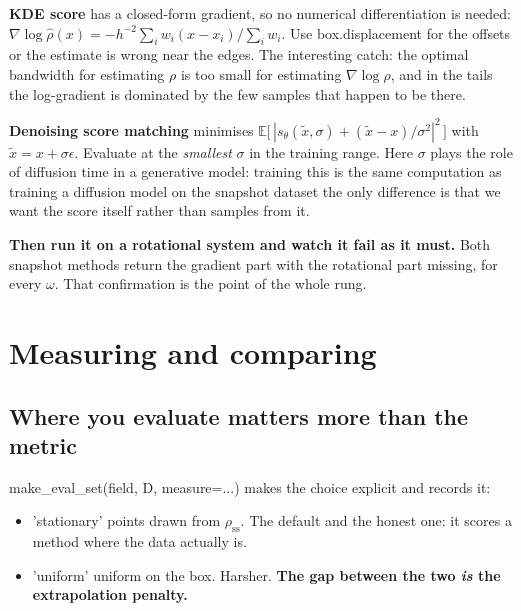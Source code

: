 \documentclass[11pt,a4paper]{article}
\newcommand{\code}[1]{{\ttfamily\small #1}}
\begin{document}
\textbf{KDE score} has a closed-form gradient, so no numerical differentiation is
needed:
$\nabla\log\hat\rho(x) = -h^{-2}\sum_i w_i (x-x_i)\big/\sum_i w_i$. Use
\code{box.displacement} for the offsets or the estimate is wrong near the edges. The
interesting catch: the optimal bandwidth for estimating $\rho$ is too small for
estimating $\nabla\log\rho$, and in the tails the log-gradient is dominated by the few
samples that happen to be there.

\textbf{Denoising score matching} minimises
$\mathbb{E}\big[\,|s_\theta(\tilde x,\sigma) + (\tilde x - x)/\sigma^2|^2\,\big]$ with
$\tilde x = x + \sigma\epsilon$. Evaluate at the \emph{smallest} $\sigma$ in the
training range. Here $\sigma$ plays the role of diffusion time in a generative model:
training this is the same computation as training a diffusion model on the snapshot
dataset \textemdash{} the only difference is that we want the score itself rather than
samples from it.

\begin{keybox}
\textbf{Then run it on a rotational system and watch it fail \textemdash{} as it must.}
Both snapshot methods return the gradient part with the rotational part missing, for
every $\omega$. That confirmation is the point of the whole rung.
\end{keybox}

\clearpage
\section{Measuring and comparing}

\subsection{Where you evaluate matters more than the metric}

\code{make\_eval\_set(field, D, measure=...)} makes the choice explicit and records it:

\begin{itemize}[leftmargin=1.4em,itemsep=1pt]
  \item \code{'stationary'} \textemdash{} points drawn from $\rho_{\mathrm{ss}}$. The
        default and the honest one: it scores a method where the data actually is.
  \item \code{'uniform'} \textemdash{} uniform on the box. Harsher. \textbf{The gap
        between the two \emph{is} the extrapolation penalty.}
\end{itemize}
\end{document}
